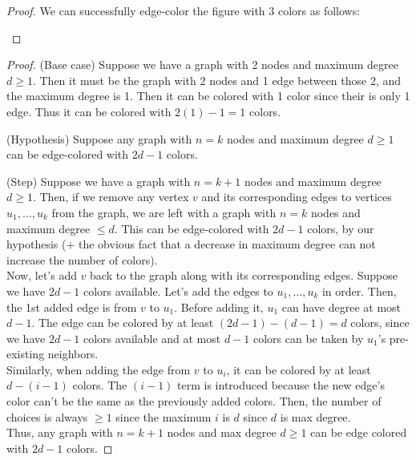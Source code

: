 \documentclass[11pt]{article}
\begin{document}
\begin{solution}
\begin{Parts}
\Part \begin{proof}
We can successfully edge-color the figure with 3 colors as follows:
\begin{center}
\end{center}
\end{proof}

\Part \begin{proof}
(Base case) Suppose we have a graph with 2 nodes and maximum degree $d\geq1$.
Then it must be the graph with 2 nodes and 1 edge between those 2, and the maximum degree is 1.
Then it can be colored with 1 color since their is only 1 edge.
Thus it can be colored with $2(1)-1=1$ colors.

(Hypothesis) Suppose any graph with $n=k$ nodes and maximum degree $d\geq1$ can be edge-colored with $2d-1$ colors.

(Step) Suppose we have a graph with $n=k+1$ nodes and maximum degree $d\geq1$.
Then, if we remove any vertex $v$ and its corresponding edges to vertices $u_1,\dots,u_k$ from the graph, we are left with a graph with $n=k$ nodes and maximum degree $\leq d$.
This can be edge-colored with $2d-1$ colors, by our hypothesis (+ the obvious fact that a decrease in maximum degree can not increase the number of colors).
\\Now, let's add $v$ back to the graph along with its corresponding edges.
Suppose we have $2d-1$ colors available.
Let's add the edges to $u_1,\dots ,u_k$ in order.
Then, the 1st added edge is from $v$ to $u_1$.
Before adding it, $u_1$ can have degree at most $d-1$.
The edge can be colored by at least $(2d-1)-(d-1)=d$ colors, since we have $2d-1$ colors available and at most $d-1$ colors can be taken by $u_1$'s pre-existing neighbors.
\\Similarly, when adding the edge from $v$ to $u_i$, it can be colored by at least $d-(i-1)$ colors.
The $(i-1)$ term is introduced because the new edge's color can't be the same as the previously added colors.
Then, the number of choices is always $\geq 1$ since the maximum $i$ is $d$ since $d$ is max degree.
\\Thus, any graph with $n=k+1$ nodes and max degree $d\geq1$ can be edge colored with $2d-1$ colors.
\end{proof}


\end{Parts}
\end{solution}
\end{document}
